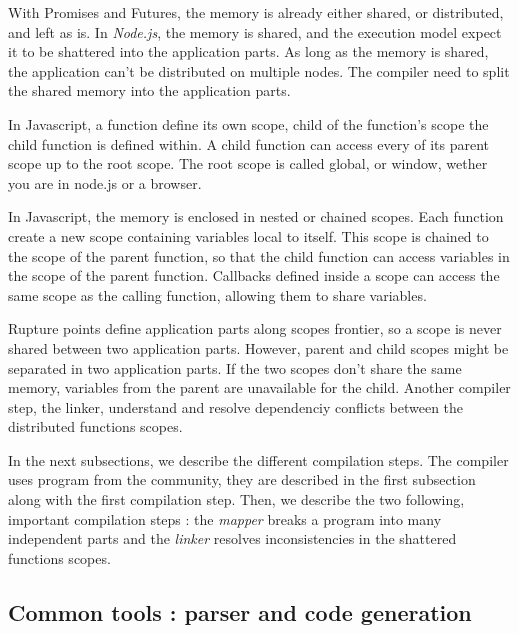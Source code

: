 With Promises and Futures, the memory is already either shared, or distributed, and left as is.
In \textit{Node.js}, the memory is shared, and the execution model expect it to be shattered into the application parts.
As long as the memory is shared, the application can't be distributed on multiple nodes.
The compiler need to split the shared memory into the application parts.

In Javascript, a function define its own scope, child of the function's scope the child function is defined within.
A child function can access every of its parent scope up to the root scope.
The root scope is called global, or window, wether you are in node.js or a browser.

In Javascript, the memory is enclosed in nested or chained scopes.
Each function create a new scope containing variables local to itself.
This scope is chained to the scope of the parent function, so that the child function can access variables in the scope of the parent function.
Callbacks defined inside a scope can access the same scope as the calling function, allowing them to share variables.

Rupture points define application parts along scopes frontier, so a scope is never shared between two application parts.
However, parent and child scopes might be separated in two application parts.
If the two scopes don't share the same memory, variables from the parent are unavailable for the child.
Another compiler step, the linker, understand and resolve dependenciy conflicts between the distributed functions scopes.

In the next subsections, we describe the different compilation steps.
The compiler uses program from the community, they are described in the first subsection along with the first compilation step.
Then, we describe the two following, important compilation steps : the \textit{mapper} breaks a program into many independent parts and the \textit{linker} resolves inconsistencies in the shattered functions scopes.


\subsection{Common tools : parser and code generation}

